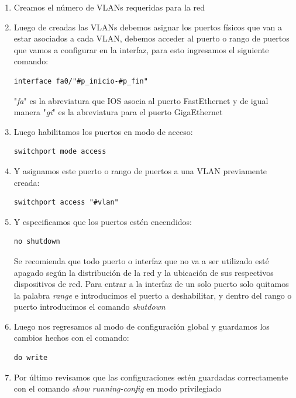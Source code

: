 \documentclass[journal]{IEEEtran}
\begin{document}
\begin{enumerate}
	\item Creamos el número de VLANs requeridas para la red
	
	\item Luego de creadas las VLANs debemos asignar los puertos físicos que van a estar asociados a cada VLAN, debemos acceder al puerto o rango de puertos que vamos a configurar en la interfaz, para esto ingresamos el siguiente comando:
	\begin{lstlisting}[frame=single]
interface fa0/"#p_inicio-#p_fin"
	\end{lstlisting}
	"\textit{fa}" es la abreviatura que IOS asocia al puerto FastEthernet y de igual manera "\textit{gi}" es la abreviatura para el puerto GigaEthernet
	
	\item Luego habilitamos los puertos en modo de acceso:
	\begin{lstlisting}[frame=single]
switchport mode access
	\end{lstlisting} 
	
	\item Y asignamos este puerto o rango de puertos a una VLAN previamente creada:
	\begin{lstlisting}[frame=single]
switchport access "#vlan"
	\end{lstlisting}
	
	\item Y especificamos que los puertos estén encendidos:
	\begin{lstlisting}[frame=single]
no shutdown
	\end{lstlisting}
	Se recomienda que todo puerto o interfaz que no va a ser utilizado esté apagado según la distribución de la red y la ubicación de sus respectivos dispositivos de red.
	Para entrar a la interfaz de un solo puerto solo quitamos la palabra \textit{range} e introducimos el puerto a deshabilitar, y dentro del rango o puerto introducimos el comando \textit{shutdown}
	
	\item Luego nos regresamos al modo de configuración global y guardamos los cambios hechos con el comando:
	\begin{lstlisting}[frame=single]
do write
	\end{lstlisting}
	
	 \item Por último revisamos que las configuraciones estén guardadas correctamente con el comando \textit{show running-config} en modo privilegiado 
	 
\end{enumerate}
\end{document}
